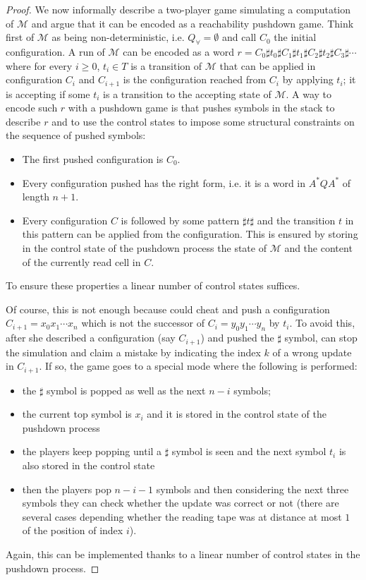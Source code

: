 \begin{proof}
We now informally describe a two-player game simulating a computation of $\mathcal{M}$ and argue that it can be encoded as a reachability pushdown game. Think first of $\mathcal{M}$ as being non-deterministic, i.e. $Q_\forall=\emptyset$ and call $C_0$ the initial configuration. A run of $\mathcal{M}$ can be encoded as a word $r=C_0\sharp t_0\sharp C_1\sharp t_1\sharp C_2\sharp t_2\sharp C_3\sharp\cdots$ where for every $i\geq 0$, $t_i\in T$ is a transition of $\mathcal{M}$ that can be applied in configuration $C_i$ and $C_{i+1}$ is the configuration reached from $C_i$ by applying $t_i$; it is accepting if some $t_i$ is a transition to the accepting state of $\mathcal{M}$. A way to encode such $r$ with a pushdown game is that \Eve pushes symbols in the stack to describe $r$ and to use the control states to impose some structural constraints on the sequence of pushed symbols:
\begin{itemize}
	\item The first pushed configuration is $C_0$.
	\item Every configuration pushed has the right form, i.e. it is a word in $A^*QA^*$ of length $n+1$. 
	\item Every configuration $C$ is followed by some pattern $\sharp t\sharp$ and the transition $t$ in this pattern can be applied from the configuration. This is ensured by storing in the control state of the pushdown process the state of $\mathcal{M}$ and the content of the currently read cell in $C$. 
\end{itemize}
To ensure these properties a linear number of control states suffices. 

Of course, this is not enough because \Eve could cheat and push a configuration $C_{i+1}=x_0x_1\cdots x_n$ which is not the successor of $C_i=y_0y_1\cdots y_n$ by $t_i$. To avoid this, after she described a configuration (say $C_{i+1}$) and pushed the $\sharp$ symbol, \Adam can stop the simulation and claim a mistake by indicating the index $k$ of a wrong update in $C_{i+1}$. If so, the game goes to a special mode where the following is performed:
\begin{itemize}
	\item the $\sharp$ symbol is popped as well as the next $n-i$ symbols;
	\item the current top symbol is $x_i$ and it is stored in the control state of the pushdown process
	\item the players keep popping until a $\sharp$ symbol is seen and the next symbol $t_i$ is also stored in the control state
	\item then the players pop $n-i-1$ symbols and then considering the next three symbols they can check whether the update was correct or not (there are several cases depending whether the reading tape was at distance at most $1$ of the position of index $i$).
\end{itemize}
Again, this can be implemented thanks to a linear number of control states in the pushdown process.


\end{proof}
